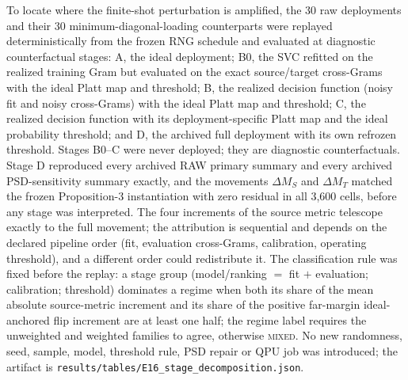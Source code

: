 \documentclass[11pt,a4paper]{article}
\begin{document}
To locate where the finite-shot perturbation is amplified, the 30 raw
deployments and their 30 minimum-diagonal-loading counterparts were replayed
deterministically from the frozen RNG schedule and evaluated at diagnostic
counterfactual stages: A, the ideal deployment; B0, the SVC refitted on the
realized training Gram but evaluated on the exact source/target cross-Grams
with the ideal Platt map and threshold; B, the realized decision function
(noisy fit and noisy cross-Grams) with the ideal Platt map and threshold; C,
the realized decision function with its deployment-specific Platt map and the
ideal probability threshold; and D, the archived full deployment with its own
refrozen threshold. Stages B0--C were never deployed; they are diagnostic
counterfactuals. Stage D reproduced every archived RAW primary summary and
every archived PSD-sensitivity summary exactly, and the movements
$\Delta M_S$ and $\Delta M_T$ matched the frozen Proposition-3 instantiation
with zero residual in all 3,600 cells, before any stage was interpreted. The
four increments of the source metric telescope exactly to the full movement;
the attribution is sequential and depends on the declared pipeline order
(fit, evaluation cross-Grams, calibration, operating threshold), and a
different order could redistribute it. The classification rule was fixed
before the replay: a stage group (model/ranking $=$ fit $+$ evaluation;
calibration; threshold) dominates a regime when both its share of the mean
absolute source-metric increment and its share of the positive far-margin
ideal-anchored flip increment are at least one half; the regime label
requires the unweighted and weighted families to agree, otherwise
\textsc{mixed}. No new randomness, seed, sample, model, threshold rule, PSD
repair or QPU job was introduced; the artifact is
\texttt{results/tables/E16\_stage\_decomposition.json}.
\end{document}
